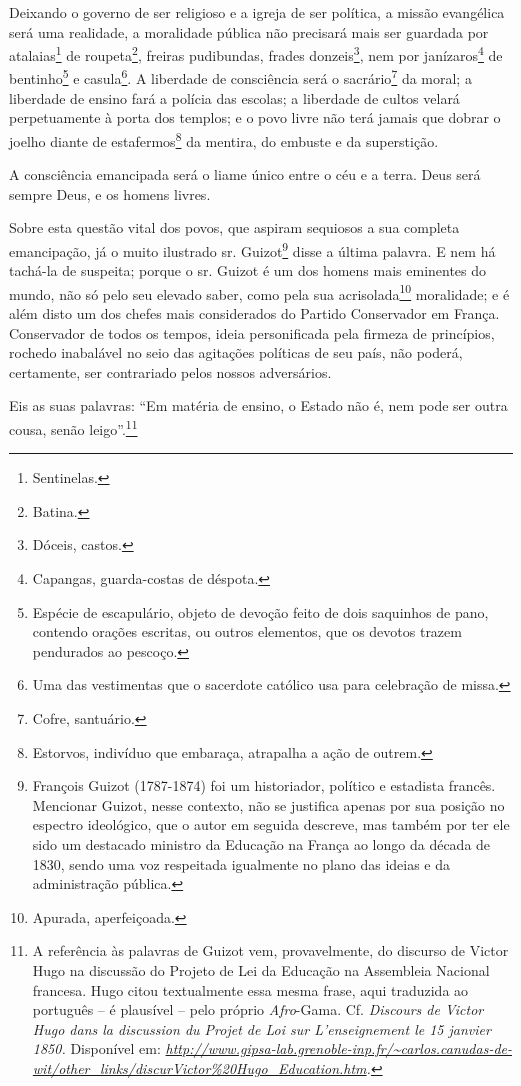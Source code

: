 Deixando o governo de ser religioso e a igreja de ser política, a missão
evangélica será uma realidade, a moralidade pública não precisará mais
ser guardada por atalaias\footnote{Sentinelas.} de roupeta\footnote{
  Batina.}, freiras pudibundas, frades donzeis\footnote{Dóceis,
  castos.}, nem por janízaros\footnote{Capangas, guarda-costas de
  déspota.} de bentinho\footnote{Espécie de escapulário, objeto de
  devoção feito de dois saquinhos de pano, contendo orações escritas, ou
  outros elementos, que os devotos trazem pendurados ao pescoço.} e
casula\footnote{Uma das vestimentas que o sacerdote católico usa para
  celebração de missa.}. A liberdade de consciência será o
sacrário\footnote{Cofre, santuário.} da moral; a liberdade de ensino
fará a polícia das escolas; a liberdade de cultos velará perpetuamente à
porta dos templos; e o povo livre não terá jamais que dobrar o joelho
diante de estafermos\footnote{Estorvos, indivíduo que embaraça,
  atrapalha a ação de outrem.} da mentira, do embuste e da superstição.

A consciência emancipada será o liame único entre o céu e a terra. Deus
será sempre Deus, e os homens livres.

Sobre esta questão vital dos povos, que aspiram sequiosos a sua completa
emancipação, já o muito ilustrado sr. Guizot\footnote{François Guizot
  (1787-1874) foi um historiador, político e estadista francês.
  Mencionar Guizot, nesse contexto, não se justifica apenas por sua
  posição no espectro ideológico, que o autor em seguida descreve, mas
  também por ter ele sido um destacado ministro da Educação na França ao
  longo da década de 1830, sendo uma voz respeitada igualmente no plano
  das ideias e da administração pública.} disse a última palavra. E nem
há tachá-la de suspeita; porque o sr. Guizot é um dos homens mais
eminentes do mundo, não só pelo seu elevado saber, como pela sua
acrisolada\footnote{Apurada, aperfeiçoada.} moralidade; e é além disto
um dos chefes mais considerados do Partido Conservador em França.
Conservador de todos os tempos, ideia personificada pela firmeza de
princípios, rochedo inabalável no seio das agitações políticas de seu
país, não poderá, certamente, ser contrariado pelos nossos adversários.

Eis as suas palavras: ``Em matéria de ensino, o Estado não é, nem pode
ser outra cousa, senão leigo''.\footnote{A referência às palavras de
  Guizot vem, provavelmente, do discurso de Victor Hugo na discussão do
  Projeto de Lei da Educação na Assembleia Nacional francesa. Hugo citou
  textualmente essa mesma frase, aqui traduzida ao português -- é
  plausível -- pelo próprio \emph{Afro}-Gama. Cf. \emph{Discours de
  Victor Hugo dans la discussion du Projet de Loi sur L'enseignement le
  15 janvier 1850.} Disponível em:
  \emph{\url{http://www.gipsa-lab.grenoble-inp.fr/~carlos.canudas-de-wit/other_links/discurVictor\%20Hugo_Education.htm}.}}

